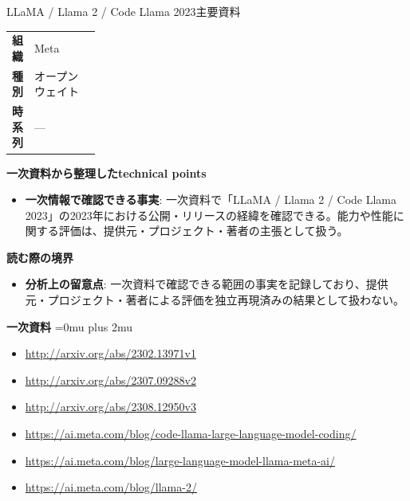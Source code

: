 \begin{technicalnote}{LLaMA / Llama 2 / Code Llama 2023}{主要資料}
\begingroup
\begin{tabularx}{\linewidth}{@{}>{\bfseries}p{0.22\linewidth}X@{}}
組織 & Meta \\
種別 & オープンウェイト \\
時系列 & — \\
\end{tabularx}
\smallskip
{\bfseries 一次資料から整理したtechnical points}
\begin{itemize}[leftmargin=1.5em,itemsep=0.35em]
\item \textbf{一次情報で確認できる事実}: 一次資料で「LLaMA / Llama 2 / Code Llama 2023」の2023年における公開・リリースの経緯を確認できる。能力や性能に関する評価は、提供元・プロジェクト・著者の主張として扱う。
\end{itemize}
\begin{minipage}{\linewidth}
{\bfseries 読む際の境界}
\begin{itemize}[leftmargin=1.5em,itemsep=0.35em]
\item \textbf{分析上の留意点}: 一次資料で確認できる範囲の事実を記録しており、提供元・プロジェクト・著者による評価を独立再現済みの結果として扱わない。
\end{itemize}
\begin{samepage}
{\bfseries 一次資料}
\begingroup\sloppy
\Urlmuskip=0mu plus 2mu\relax
\begin{itemize}[leftmargin=1.5em,itemsep=0.25em]
\item {\scriptsize\url{http://arxiv.org/abs/2302.13971v1}}
\item {\scriptsize\url{http://arxiv.org/abs/2307.09288v2}}
\item {\scriptsize\url{http://arxiv.org/abs/2308.12950v3}}
\item {\scriptsize\url{https://ai.meta.com/blog/code-llama-large-language-model-coding/}}
\item {\scriptsize\url{https://ai.meta.com/blog/large-language-model-llama-meta-ai/}}
\item {\scriptsize\url{https://ai.meta.com/blog/llama-2/}}
\end{itemize}
\endgroup
\end{samepage}
\end{minipage}
\endgroup
\end{technicalnote}
\medskip

